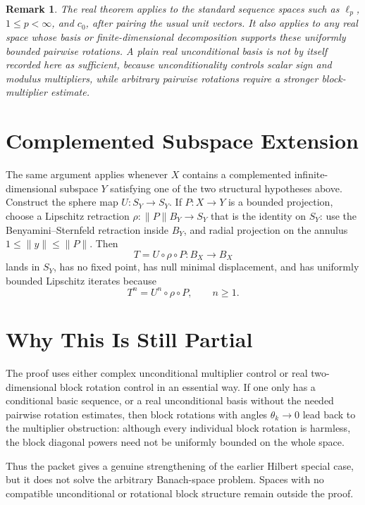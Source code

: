 \documentclass[11pt]{article}
\newtheorem{remark}{Remark}
\begin{document}
\begin{remark}
The real theorem applies to the standard sequence spaces such as
\(\ell_p\), \(1\le p<\infty\), and \(c_0\), after pairing the usual unit
vectors.  It also applies to any real space whose basis or finite-dimensional
decomposition supports these uniformly bounded pairwise rotations.  A plain
real unconditional basis is not by itself recorded here as sufficient,
because unconditionality controls scalar sign and modulus multipliers, while
arbitrary pairwise rotations require a stronger block-multiplier estimate.
\end{remark}

\section*{Complemented Subspace Extension}

The same argument applies whenever \(X\) contains a complemented
infinite-dimensional subspace \(Y\) satisfying one of the two structural
hypotheses above.  Construct the sphere map \(U:S_Y\to S_Y\).  If
\(P:X\to Y\) is a bounded projection, choose a Lipschitz retraction
\(\rho:\|P\|B_Y\to S_Y\) that is the identity on \(S_Y\): use the
Benyamini--Sternfeld retraction inside \(B_Y\), and radial projection on the
annulus \(1\le\|y\|\le\|P\|\).  Then
\[
T=U\circ \rho\circ P:B_X\to B_X
\]
lands in \(S_Y\), has no fixed point, has null minimal displacement, and has
uniformly bounded Lipschitz iterates because
\[
T^n=U^n\circ \rho\circ P,\qquad n\ge1.
\]

\section*{Why This Is Still Partial}

The proof uses either complex unconditional multiplier control or real
two-dimensional block rotation control in an essential way.  If one only has
a conditional basic sequence, or a real unconditional basis without the
needed pairwise rotation estimates, then block rotations with angles
\(\theta_k\to0\) lead back to the multiplier obstruction: although every
individual block rotation is harmless, the block diagonal powers need not be
uniformly bounded on the whole space.

Thus the packet gives a genuine strengthening of the earlier Hilbert special
case, but it does not solve the arbitrary Banach-space problem.  Spaces with
no compatible unconditional or rotational block structure remain outside the
proof.
\end{document}
